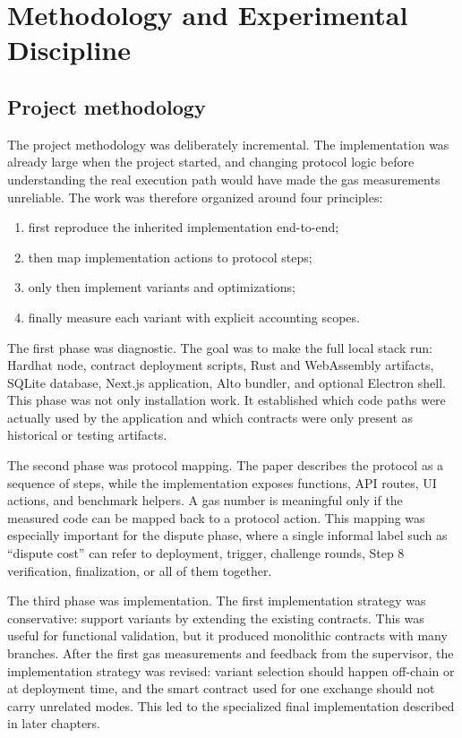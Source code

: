 \chapter[Methodology and Experiments]{Methodology and Experimental Discipline}
\label{chap:methodology}

\section{Project methodology}

The project methodology was deliberately incremental. The implementation was already large
when the project started, and changing protocol logic before understanding the real execution
path would have made the gas measurements unreliable. The work was therefore organized
around four principles:

\begin{enumerate}
  \item first reproduce the inherited implementation end-to-end;
  \item then map implementation actions to protocol steps;
  \item only then implement variants and optimizations;
  \item finally measure each variant with explicit accounting scopes.
\end{enumerate}

The first phase was diagnostic. The goal was to make the full local stack run: Hardhat node,
contract deployment scripts, Rust and WebAssembly artifacts, SQLite database, Next.js
application, Alto bundler, and optional Electron shell. This phase was not only installation
work. It established which code paths were actually used by the application and which
contracts were only present as historical or testing artifacts.

The second phase was protocol mapping. The paper describes the protocol as a sequence of
steps, while the implementation exposes functions, API routes, UI actions, and benchmark
helpers. A gas number is meaningful only if the measured code can be mapped back to a
protocol action. This mapping was especially important for the dispute phase, where a single
informal label such as ``dispute cost'' can refer to deployment, trigger, challenge rounds,
Step 8 verification, finalization, or all of them together.

The third phase was implementation. The first implementation strategy was conservative:
support variants by extending the existing contracts. This was useful for functional
validation, but it produced monolithic contracts with many branches. After the first gas
measurements and feedback from the supervisor, the implementation strategy was revised:
variant selection should happen off-chain or at deployment time, and the smart contract used
for one exchange should not carry unrelated modes. This led to the specialized final
implementation described in later chapters.

